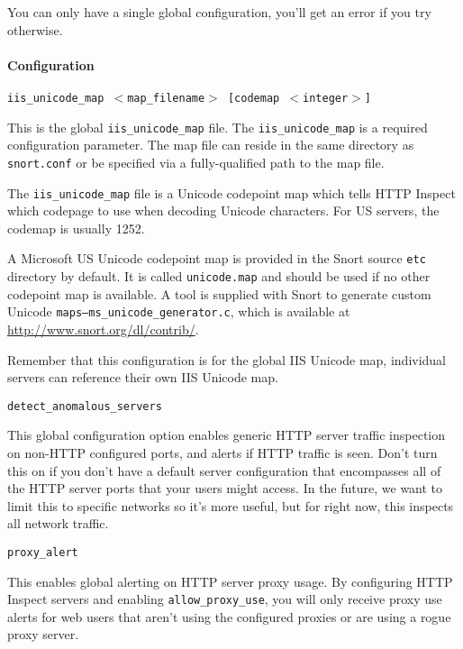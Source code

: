 \documentclass[english]{report}
\newcounter{slistnum}
\newenvironment{slist}
{ \begin{list}{ {\bf \arabic{slistnum}.} }{\usecounter{slistnum} } }
{ \end{list} }
\newenvironment{note}{
\samepage
    \vspace{10pt}{\textsf{
        {\hspace{7pt}\Huge{$\triangle$\hspace{-12.5pt}{\Large{$^!$}}}}\hspace{5pt}
        {\Large{NOTE}}
    }
    }
   \begin{center}
    \par\vspace{-17pt}

    \begin{lrbox}{\savepar}
    \begin{minipage}[r]{6in}
}
{
    \end{minipage}
    \end{lrbox}
    \fbox{
        \usebox{
            \savepar
	}
    }
    \par\vskip10pt
    \end{center}
}
\newenvironment{note}{
        \begin{rawhtml}
        <p><table border="1"><tr><td><b>
        Note:&nbsp;&nbsp;</b>
        \end{rawhtml}
}{
        \begin{rawhtml}
        </b></td></tr></table></p>
        \end{rawhtml}
}
\begin{document}
You can only have a single global configuration, you'll get an error if you try
otherwise.

\paragraph{Configuration}
\begin{slist}
\item \texttt{iis\_unicode\_map $<$map\_filename$>$ [codemap $<$integer$>$]}

This is the global \texttt{iis\_unicode\_map} file.  The
\texttt{iis\_unicode\_map} is a required configuration parameter.  The map file
can reside in the same directory as \texttt{snort.conf} or be specified via a
fully-qualified path to the map file.

The \texttt{iis\_unicode\_map} file is a Unicode codepoint map which tells HTTP
Inspect which codepage to use when decoding Unicode characters.  For US
servers, the codemap is usually 1252.

A Microsoft US Unicode codepoint map is provided in the Snort source
\texttt{etc} directory by default.  It is called \texttt{unicode.map} and
should be used if no other codepoint map is available.  A tool is supplied with
Snort to generate custom Unicode \texttt{maps--ms\_unicode\_generator.c}, which
is available at \url{http://www.snort.org/dl/contrib/}.

\begin{note}

Remember that this configuration is for the global IIS Unicode map, individual
servers can reference their own IIS Unicode map.

\end{note}

\item \texttt{detect\_anomalous\_servers}

This global configuration option enables generic HTTP server traffic inspection
on non-HTTP configured ports, and alerts if HTTP traffic is seen.  Don't turn
this on if you don't have a default server configuration that encompasses all
of the HTTP server ports that your users might access.  In the future, we want
to limit this to specific networks so it's more useful, but for right now, this
inspects all network traffic.

\item \texttt{proxy\_alert}

This enables global alerting on HTTP server proxy usage.  By configuring HTTP
Inspect servers and enabling \texttt{allow\_proxy\_use}, you will only receive
proxy use alerts for web users that aren't using the configured proxies or are
using a rogue proxy server.


\end{slist}
\end{document}
